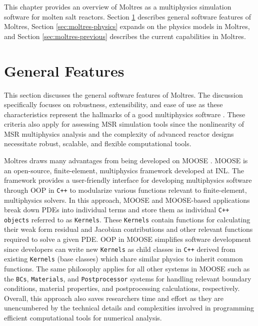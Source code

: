 This chapter provides an overview of Moltres as a multiphysics
simulation software for molten salt reactors. 
Section \ref{sec:moltres-features}
describes general software features of Moltres, Section
\ref{sec:moltres-physics} expands on the physics models in Moltres, and Section
\ref{sec:moltres-previous} describes the current capabilities in Moltres.

\section{General Features} \label{sec:moltres-features}

This section discusses the general software features of Moltres. The
discussion specifically focuses on robustness, extensibility, and ease of use
as these characteristics represent the hallmarks of a good multiphysics
software \cite{keyes_multiphysics_2013}. These criteria also apply for
assessing \gls{MSR} simulation tools since the nonlinearity of \gls{MSR}
multiphysics analysis and the complexity of advanced reactor designs
necessitate robust, scalable, and flexible computational tools.

Moltres draws many advantages from being developed on MOOSE
\cite{permann_moose_2020}. MOOSE is an open-source, finite-element,
multiphysics framework developed at \gls{INL}. The framework provides a
user-friendly interface for developing multiphysics software through
\gls{OOP} in \texttt{C++} to modularize various
functions relevant to finite-element, multiphysics solvers. In this approach,
MOOSE and MOOSE-based applications break down \glspl{PDE} into individual terms
and store them as individual \texttt{C++ objects} referred to as
\texttt{Kernels}. These \texttt{Kernels} contain functions for calculating
their weak form residual and Jacobian
contributions and other relevant functions required to solve a given
\gls{PDE}. \gls{OOP} in MOOSE simplifies software development
since developers can write new \texttt{Kernels} as child classes in
\texttt{C++} derived from existing \texttt{Kernels} (base classes) which share
similar physics to inherit common functions.
The same philosophy applies for all other systems in MOOSE such as
the \texttt{BCs}, \texttt{Materials}, and \texttt{Postprocessor}
systems for handling relevant boundary conditions, material properties, and
postprocessing calculations, respectively. Overall, this approach also saves
researchers time and effort as they are unencumbered by the technical details
and complexities involved in programming efficient computational tools for
numerical analysis.


